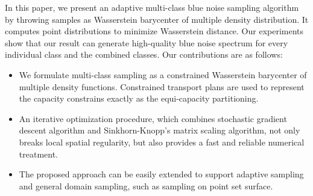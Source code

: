 In this paper, we present an adaptive multi-class blue noise sampling algorithm by
throwing samples as Wasserstein barycenter of multiple density distribution.
It computes point distributions to minimize Wasserstein distance.
Our experiments show that our result can generate high-quality blue noise spectrum for every individual class and the combined classes.
Our contributions are as follows:
\begin{itemize}
\item We formulate multi-class sampling as a constrained Wasserstein barycenter of multiple density functions.
Constrained transport plans  are used to represent the capacity constrains exactly as the equi-capacity partitioning.
\item An iterative optimization procedure,
which combines stochastic gradient descent algorithm and Sinkhorn-Knopp's matrix scaling algorithm,
not only breaks local spatial regularity, but also provides a fast and reliable numerical treatment.
\item The proposed approach can be easily extended to support adaptive sampling and general domain sampling,
such as sampling on point set surface.
\end{itemize}
